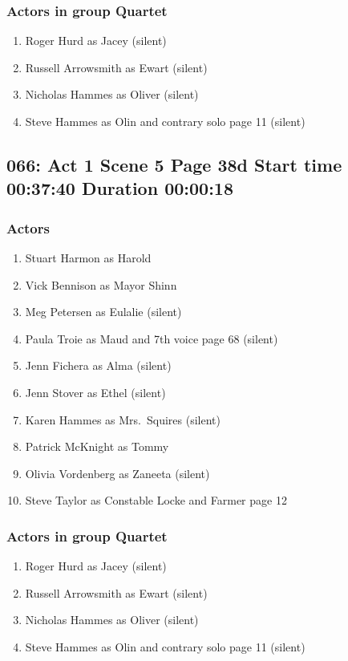 \subsubsection{Actors in group Quartet}
\begin{enumerate}
\item Roger Hurd as Jacey (silent)
\item Russell Arrowsmith as Ewart (silent)
\item Nicholas Hammes as Oliver (silent)
\item Steve Hammes as Olin and contrary solo page 11 (silent)
\end{enumerate}


\subsection{066: Act 1 Scene 5 Page 38d Start time 00:37:40 Duration 00:00:18}

\subsubsection{Actors}
\begin{enumerate}
\item Stuart Harmon as Harold
\item Vick Bennison as Mayor Shinn
\item Meg Petersen as Eulalie (silent)
\item Paula Troie as Maud and 7th voice page 68 (silent)
\item Jenn Fichera as Alma (silent)
\item Jenn Stover as Ethel (silent)
\item Karen Hammes as Mrs.~Squires (silent)
\item Patrick McKnight as Tommy
\item Olivia Vordenberg as Zaneeta (silent)
\item Steve Taylor as Constable Locke and Farmer page 12
\end{enumerate}
\subsubsection{Actors in group Quartet}
\begin{enumerate}
\item Roger Hurd as Jacey (silent)
\item Russell Arrowsmith as Ewart (silent)
\item Nicholas Hammes as Oliver (silent)
\item Steve Hammes as Olin and contrary solo page 11 (silent)
\end{enumerate}


